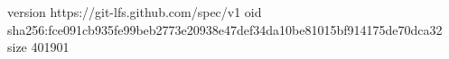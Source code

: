version https://git-lfs.github.com/spec/v1
oid sha256:fce091cb935fe99beb2773e20938e47def34da10be81015bf914175de70dca32
size 401901
